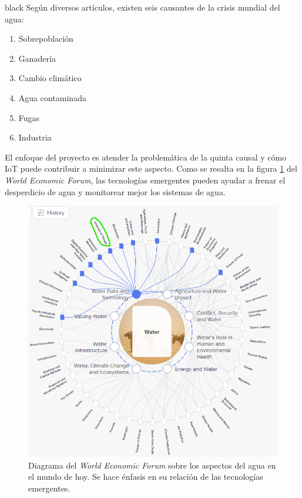 \documentclass[
11pt, %
codirector, %
]{charter}
\begin{document}
\begin{consigna}{black}
Según diversos artículos, existen seis causantes de la crisis mundial del agua:
\begin{enumerate}
\item Sobrepoblación
\item Ganadería
\item Cambio climático
\item Agua contaminada
\item Fugas
\item Industria
\end{enumerate}

El enfoque del proyecto es atender la problemática de la quinta causal y cómo IoT puede contribuir a minimizar este aspecto. Como se resalta en la figura \ref{fig:WEFoum-Water-IoT} del \textit{World Economic Forum}, las tecnologías emergentes pueden ayudar a frenar el desperdicio de agua y monitorear mejor los sistemas de agua.

\begin{figure}[htpb]
\centering 
\includegraphics[width=1\textwidth]{./Figuras/WEFoum-Water-IoT.png} 
\caption{Diagrama del \textit{World Economic Forum} sobre los aspectos del agua en el mundo de hoy. Se hace énfasis en su relación de las tecnologías emergentes.}
\label{fig:WEFoum-Water-IoT}
\end{figure}


\end{consigna}
\end{document}
